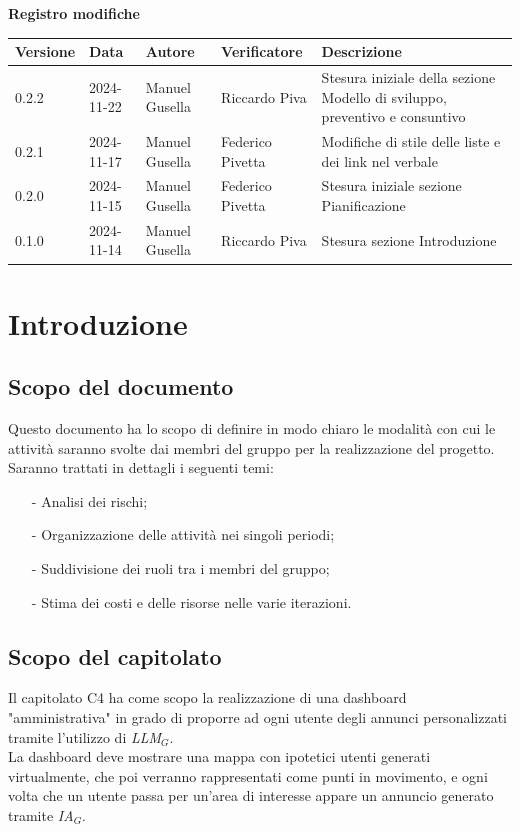 \documentclass[12pt]{article}
\begin{document}
\setcounter{page}{1}
\begin{center}
\textbf{Registro modifiche}\\
\vspace{2mm}
\begin{tabularx}{\textwidth}{|l|l|l|l|X|}
\hline
\textbf{Versione} & \textbf{Data} & \textbf{Autore} & \textbf{Verificatore} & \textbf{Descrizione}\\
\hline
0.2.2 & 2024-11-22 & Manuel Gusella & Riccardo Piva & Stesura iniziale della sezione  Modello di sviluppo, preventivo e consuntivo\\
\hline
0.2.1 & 2024-11-17 & Manuel Gusella & Federico Pivetta & Modifiche di stile delle liste e dei link nel verbale \\
\hline
0.2.0 & 2024-11-15 & Manuel Gusella & Federico Pivetta & Stesura iniziale sezione Pianificazione\\
\hline
0.1.0 & 2024-11-14  & Manuel Gusella & Riccardo Piva & Stesura sezione Introduzione\\
\hline

\end{tabularx}   
\end{center}
\newpage
\tableofcontents
\newpage
\section{Introduzione}
\subsection{Scopo del documento}
Questo documento ha lo scopo di definire in modo chiaro le modalità con cui le attività saranno svolte dai membri del gruppo per la realizzazione del progetto.\\
Saranno trattati in dettagli i seguenti temi:
\begin{itemize}
    \item [-] Analisi dei rischi;
    \item [-] Organizzazione delle attività nei singoli periodi;
    \item [-] Suddivisione dei ruoli tra i membri del gruppo;
    \item [-] Stima dei costi e delle risorse nelle varie iterazioni.
\end{itemize}

\subsection{Scopo del capitolato}
Il capitolato C4 ha come scopo la realizzazione di una dashboard "amministrativa" in grado di proporre ad ogni utente degli annunci personalizzati tramite l'utilizzo di \textit{LLM}$_G$.\\ La dashboard deve mostrare una mappa con ipotetici utenti generati virtualmente, che poi verranno rappresentati come punti in movimento, e ogni volta che un utente passa per un'area di interesse appare un annuncio generato tramite \textit{IA}$_G$.
\end{document}
